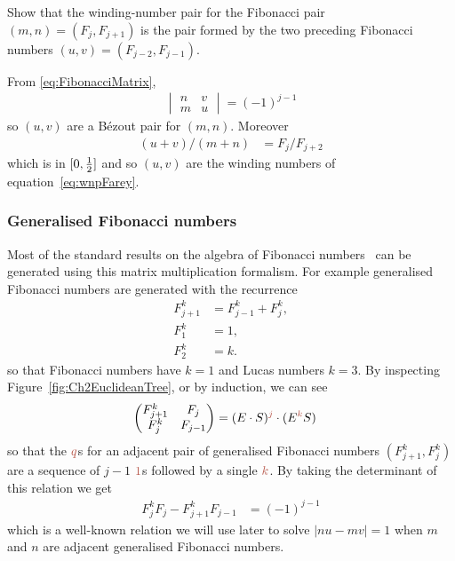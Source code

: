 \begin{jExercise}
	Show that  the winding-number pair for the Fibonacci pair $(m,n)= (F_j,F_{j+1})$ is the pair formed by the two preceding Fibonacci numbers $(u,v)=(F_{j-2},F_{j-1})$.
\end{jExercise}
\begin{jAnswer}  
From \eqref{eq:FibonacciMatrix},
	\begin{align}		 
		\begin{vmatrix} 
		n  & v
			\\
			m & u
			\end{vmatrix}
			= (-1)^{j-1} 
	\end{align}
so $(u,v)$ are a B\'ezout pair for $(m,n)$. Moreover
	\begin{align}		 
(u+v)/(m+n)&= F_j/F_{j+2}
	\end{align}
	which is in $[0,\textstyle{\frac{1}{2}}]$ and so $(u,v)$ are the winding numbers of equation~\ref{eq:wnpFarey}.
\end{jAnswer}

\subsubsection{Generalised Fibonacci numbers}
Most of the standard results on the algebra of Fibonacci numbers~\cite{koshyFibonacciLucasNumbers2001,dunlapGoldenRatioFibonacci1997,coxeterIntroductionGeometry1989} can be generated using this matrix multiplication formalism. For example
generalised Fibonacci numbers are generated with the  recurrence
\begin{align}
	\label{eq:GeneralisedF}
		F^k_{j+1} &=  F^k_{j-1}+  F^k_{j}, \\
		F^k_1&=1,\\
		F^k_2&=k.
\end{align}
so that Fibonacci numbers have $k=1$ and Lucas numbers $k=3$. By inspecting Figure~\ref{fig:Ch2EuclideanTree}, or by induction, we can see
\begin{align}
	\begin{pmatrix} 
		F^k_{j+1} & F_j 
		\\
		F^k_j & F_{j-1}
	\end{pmatrix} &= 	(E\cdot  S)^{\jqn{j}} \cdot  (E^{\jqn{k}} S) 
\label{eq:GeneralizedFibonacciMatrix}
\end{align}
so that the $\jq$s for an adjacent pair of generalised Fibonacci numbers  $(F^k_{j+1},F^k_j)$ are a sequence of $j-1$ $\jqn{1}$s followed by a single $\jqn{k}$.
By taking the determinant of this relation we get 
\begin{align}
	F^k_j F_j - F^k_{j+1} F_{j-1} &= (-1)^{j-1} \label{eq:fkwinding}
\end{align}
which is a well-known relation 
we will use later to solve $|nu-mv|=1$ when $m$ and $n$ are adjacent generalised Fibonacci numbers.

